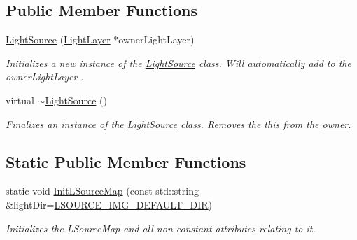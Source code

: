 \subsection*{Public Member Functions}
\begin{DoxyCompactItemize}
\item 
\hyperlink{classlighting_1_1LightSource_ae03c368df275c4a738c0e0490d9a1e18}{Light\+Source} (\hyperlink{classlighting_1_1LightLayer}{Light\+Layer} $\ast$owner\+Light\+Layer)
\begin{DoxyCompactList}\small\item\em Initializes a new instance of the \hyperlink{classlighting_1_1LightSource}{Light\+Source} class. Will automatically add to the {\itshape owner\+Light\+Layer} . \end{DoxyCompactList}\item 
virtual \hyperlink{classlighting_1_1LightSource_a2165b5cf6099c6e5d2d6d242c1c8113e}{$\sim$\+Light\+Source} ()
\begin{DoxyCompactList}\small\item\em Finalizes an instance of the \hyperlink{classlighting_1_1LightSource}{Light\+Source} class. Removes the {\ttfamily this} from the \hyperlink{classlighting_1_1LightSource_ab991aac9d9ab3a1583f4acdc209055d5}{owner}. \end{DoxyCompactList}\end{DoxyCompactItemize}
\subsection*{Static Public Member Functions}
\begin{DoxyCompactItemize}
\item 
static void \hyperlink{classlighting_1_1LightSource_a1093a521b41e902cbafb92b972617e07}{Init\+L\+Source\+Map} (const std\+::string \&light\+Dir=\hyperlink{classlighting_1_1LightSource_a4455fb30412417b0866c5a953cb55314}{L\+S\+O\+U\+R\+C\+E\+\_\+\+I\+M\+G\+\_\+\+D\+E\+F\+A\+U\+L\+T\+\_\+\+D\+IR})
\begin{DoxyCompactList}\small\item\em Initializes the L\+Source\+Map and all non constant attributes relating to it. \end{DoxyCompactList}\end{DoxyCompactItemize}
